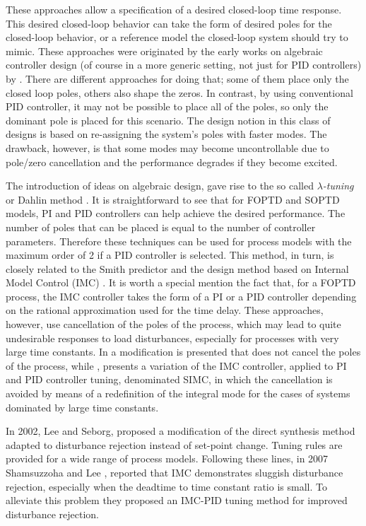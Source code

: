 These approaches allow a specification of a desired closed-loop time response. This desired closed-loop behavior can take the form of desired poles for the closed-loop behavior, or a reference model the closed-loop system should try to mimic.  These approaches were originated by the early works on algebraic controller design (of course in a more generic setting, not just for PID controllers) by \cite{ragazzini1958}. There are different approaches for doing that; some of them place only the closed loop poles, others also shape the zeros. In contrast, by using conventional PID controller, it may not be possible to place all of the poles, so only the dominant pole is placed for this scenario. The design notion in this class of designs is based on re-assigning the system's poles with faster modes. The drawback, however, is that some modes may become uncontrollable due to pole/zero cancellation and the performance degrades if they become excited.


The introduction of ideas on algebraic design, gave rise to the so called \emph{$\lambda$-tuning} or  Dahlin method \cite{dahlin68}. It is straightforward to see that for FOPTD and  SOPTD models, PI and PID
controllers can help achieve the desired performance. The number of poles that can be placed is equal to the number of controller parameters. Therefore these techniques can be used for process models with the maximum order of 2 if a PID controller is selected. This method, in turn, is closely related to the Smith predictor and the design method based on Internal Model Control (IMC) \cite{riveraetall86}.  It is worth a special mention the fact that, for a FOPTD process, the IMC controller takes the form of a PI or a PID controller depending on the rational approximation used for the time delay.  These approaches, however, use cancellation of the poles of the process, which may lead to quite undesirable responses to load disturbances, especially for processes with very large time constants. In \cite{chien90} a modification is presented  that does not cancel the poles of the process, while \cite{skogestad2003}, presents a variation of the IMC controller, applied to PI and PID controller tuning, denominated SIMC, in which the cancellation is avoided by means of a redefinition of the integral mode for the cases of systems dominated by large time constants. 

In 2002,  Lee and Seborg,\cite{chenseborg2002} proposed a modification of the direct synthesis method adapted to disturbance rejection instead of set-point change. Tuning rules are provided for a wide range of process models. Following these lines, in 2007  Shamsuzzoha and Lee \cite{shamsu2008}, reported that IMC demonstrates sluggish disturbance rejection, especially when the deadtime to time constant ratio is small. To alleviate this problem they proposed an IMC-PID tuning method for improved disturbance rejection.

